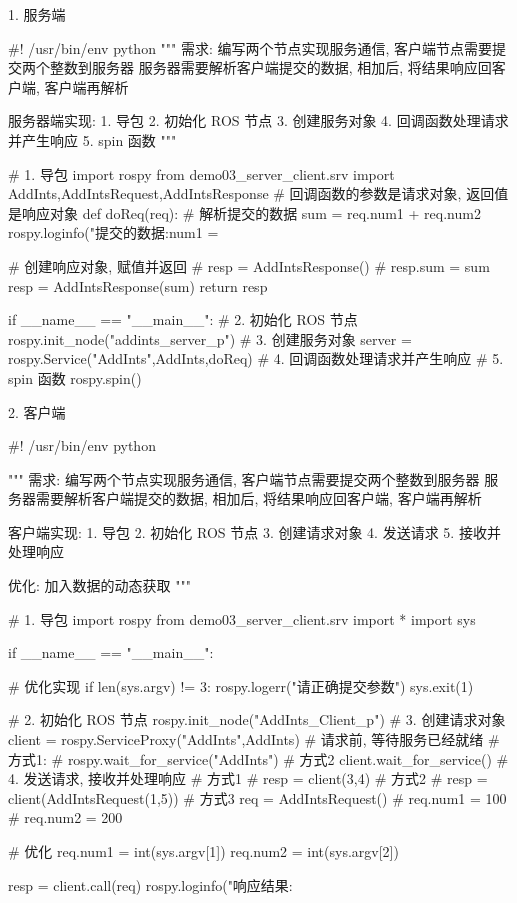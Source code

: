 \documentclass[openany, fontset=windowsold]{ctexbook}
\theoremstyle{kaiti}
\theoremstyle{normal}
\begin{document}
1. 服务端

\begin{python}
  #! /usr/bin/env python
  """
      需求: 
          编写两个节点实现服务通信, 客户端节点需要提交两个整数到服务器
          服务器需要解析客户端提交的数据, 相加后, 将结果响应回客户端, 
          客户端再解析

      服务器端实现:
          1. 导包
          2. 初始化 ROS 节点
          3. 创建服务对象
          4. 回调函数处理请求并产生响应
          5. spin 函数
  """

  # 1. 导包
  import rospy
  from demo03_server_client.srv import AddInts,AddIntsRequest,AddIntsResponse
  # 回调函数的参数是请求对象, 返回值是响应对象
  def doReq(req):
      # 解析提交的数据
      sum = req.num1 + req.num2
      rospy.loginfo("提交的数据:num1 = %

      # 创建响应对象, 赋值并返回
      # resp = AddIntsResponse()
      # resp.sum = sum
      resp = AddIntsResponse(sum)
      return resp


  if __name__ == "__main__":
      # 2. 初始化 ROS 节点
      rospy.init_node("addints_server_p")
      # 3. 创建服务对象
      server = rospy.Service("AddInts",AddInts,doReq)
      # 4. 回调函数处理请求并产生响应
      # 5. spin 函数
      rospy.spin()
\end{python}

2. 客户端

\begin{python}
  #! /usr/bin/env python

  """
      需求: 
          编写两个节点实现服务通信, 客户端节点需要提交两个整数到服务器
          服务器需要解析客户端提交的数据, 相加后, 将结果响应回客户端, 
          客户端再解析

      客户端实现:
          1. 导包
          2. 初始化 ROS 节点
          3. 创建请求对象
          4. 发送请求
          5. 接收并处理响应

      优化:
          加入数据的动态获取
  """

  # 1. 导包
  import rospy
  from demo03_server_client.srv import *
  import sys

  if __name__ == "__main__":

      # 优化实现
      if len(sys.argv) != 3:
          rospy.logerr("请正确提交参数")
          sys.exit(1)


      # 2. 初始化 ROS 节点
      rospy.init_node("AddInts_Client_p")
      # 3. 创建请求对象
      client = rospy.ServiceProxy("AddInts",AddInts)
      # 请求前, 等待服务已经就绪
      # 方式1:
      # rospy.wait_for_service("AddInts")
      # 方式2
      client.wait_for_service()
      # 4. 发送请求, 接收并处理响应
      # 方式1
      # resp = client(3,4)
      # 方式2
      # resp = client(AddIntsRequest(1,5))
      # 方式3
      req = AddIntsRequest()
      # req.num1 = 100
      # req.num2 = 200 

      # 优化
      req.num1 = int(sys.argv[1])
      req.num2 = int(sys.argv[2]) 

      resp = client.call(req)
      rospy.loginfo("响应结果:%
\end{python}
\end{document}
